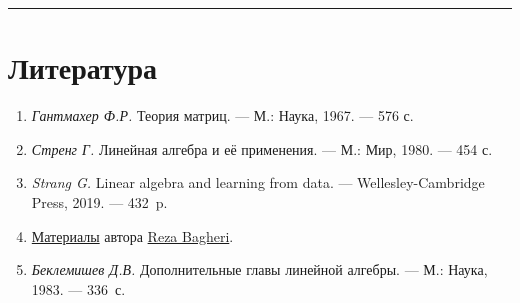 \documentclass[11pt,a4paper]{article}
\renewcommand{\linethickness}{0.1ex}
\providecommand{\tightlist}{%
      \setlength{\itemsep}{0pt}\setlength{\parskip}{0pt}}
\begin{document}
    \begin{center}\rule{0.5\linewidth}{\linethickness}\end{center}

    \hypertarget{ux43bux438ux442ux435ux440ux430ux442ux443ux440ux430}{%
\section{Литература}\label{ux43bux438ux442ux435ux440ux430ux442ux443ux440ux430}}

\begin{enumerate}
\def\labelenumi{\arabic{enumi}.}
\tightlist
\item
  \emph{Гантмахер Ф.Р.} Теория матриц. --- М.: Наука, 1967. --- 576 с.
\item
  \emph{Стренг Г.} Линейная алгебра и её применения. --- М.: Мир, 1980.
  --- 454 с.
\item
  \emph{Strang G.} Linear algebra and learning from data. ---
  Wellesley-Cambridge Press, 2019. --- 432~p.
\item
  \href{https://towardsdatascience.com/understanding-singular-value-decomposition-and-its-application-in-data-science-388a54be95d}{Материалы}
  автора \href{https://medium.com/@reza.bagheri79}{Reza Bagheri}.
\item
  \emph{Беклемишев Д.В.} Дополнительные главы линейной алгебры. --- М.:
  Наука, 1983. --- 336~с.
\end{enumerate}


    
    
    
\end{document}
